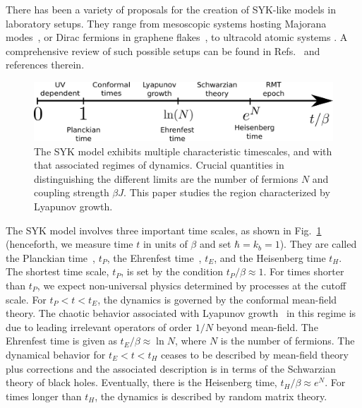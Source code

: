 There has been a variety of proposals for the creation of SYK-like models in laboratory setups.
They range from mesoscopic systems hosting Majorana modes~\cite{Pikulin2017,Chew2017},
or Dirac fermions in graphene flakes~\cite{Chen2018,can_charge_2019},
to ultracold atomic systems \cite{danshita2017creating,wei2021optical}.
A comprehensive review of such possible setups can be found in Refs.~\cite{Chowdhury-RMP2022,Franz2018-review} and references therein.


\begin{figure}[h]
	\centering
	\includegraphics[width=1.0\columnwidth]{figures/chapter1/TimeLine.png}
	\caption{The SYK model exhibits multiple characteristic timescales, and with that associated regimes of dynamics.
		Crucial quantities in distinguishing the different limits are the number of fermions $N$ and coupling strength $\beta J$.
		This paper studies the region characterized by Lyapunov growth.
	}
	\label{fig:TimeLine}
\end{figure}

The SYK model involves three important time scales, as shown in Fig.~\ref{fig:TimeLine} (henceforth,
we measure time $t$ in units of $\beta$ and set $\hbar=k_b=1$).
They are called the Planckian time~\cite{Zaanen2019,hartnoll2021planckian,patel_magnetotransport_2018,hartnoll2022colloquium}, $t_P$,
the Ehrenfest time~\cite{gu2019relation,larkin1969quasiclassical,hashimoto_out--time-order_2017,kobrin_many-body_2021,craps_lyapunov_2020}, $t_E$,
and the Heisenberg time $t_H$. The shortest time scale, $t_P$,
is set by the condition $t_P/\beta\approx 1$. For times shorter than $t_P$,
we expect non-universal physics determined by processes at the cutoff scale.
For $t_P<t<t_E$, the dynamics is governed by the conformal mean-field theory.
The chaotic behavior associated with Lyapunov growth~\cite{stanford_many-body_2016,maldacena_bound_2016} in this regime is due to leading irrelevant operators of order $1/N$ beyond mean-field.
The Ehrenfest time is given as $t_E/\beta \approx \ln N$, where $N$ is the number of fermions.
The dynamical behavior for $t_E<t<t_H$ ceases to be described by mean-field theory plus corrections and the associated description is in terms of the Schwarzian theory of black holes.
Eventually, there is the Heisenberg time, $t_H/\beta \approx e^N$.
For times longer than $t_H$, the dynamics is described by random matrix theory. 

